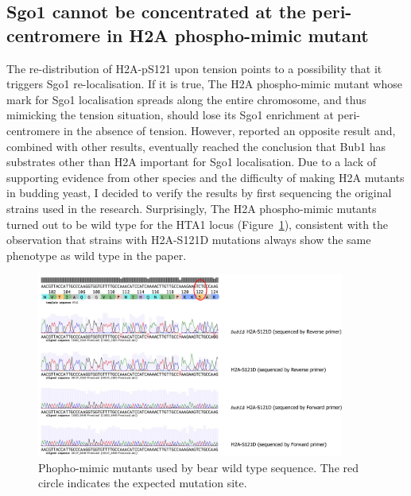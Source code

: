 \subsection{Sgo1 cannot be concentrated at the peri-centromere in H2A phospho-mimic mutant}

The re-distribution of H2A-pS121 upon tension points to a possibility that it triggers Sgo1 re-localisation. If it is true, The H2A phospho-mimic mutant whose mark for Sgo1 localisation spreads along the entire chromosome, and thus mimicking the tension situation, should lose its Sgo1 enrichment at peri-centromere in the absence of tension. However, \cite{Nerusheva2014} reported an opposite result and, combined with other results, eventually reached the conclusion that Bub1 has substrates other than H2A important for Sgo1 localisation. Due to a lack of supporting evidence from other species and the difficulty of making H2A mutants in budding yeast, I decided to verify the results by first sequencing the original strains used in the research. Surprisingly, The H2A phospho-mimic mutants turned out to be wild type for the HTA1 locus (Figure~\ref{fig:h2as121dseq}), consistent with the observation that strains with H2A-S121D mutations always show the same phenotype as wild type in the paper. 

\begin{figure}[htbp]
  \centering
  \includegraphics[width=0.9\textwidth]{chapter3/figures/nerusheva_sequencing.pdf}
  \caption[H2A phopho-mimic mutants used by \cite{Nerusheva2014} bear wild type sequence]{Phopho-mimic mutants used by \cite{Nerusheva2014} bear wild type sequence. The red circle indicates the expected mutation site.}
  \label{fig:h2as121dseq}
\end{figure}

